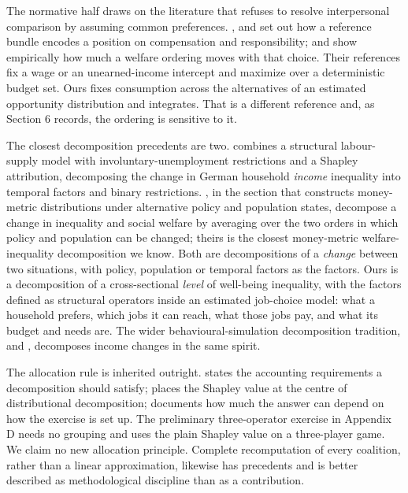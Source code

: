 \documentclass[11pt,a4paper]{article}
\begin{document}
The normative half draws on the literature that refuses to resolve interpersonal comparison by assuming common preferences. \citet{fleurbaeymaniquet2006}, \citet{fleurbaeymaniquet2017} and \citet{fleurbaeymaniquet2018} set out how a reference bundle encodes a position on compensation and responsibility; \citet{decosterhaan2015} and \citet{bargain2013} show empirically how much a welfare ordering moves with that choice. Their references fix a wage or an unearned-income intercept and maximize over a deterministic budget set. Ours fixes consumption across the alternatives of an estimated opportunity distribution and integrates. That is a different reference and, as Section 6 records, the ordering is sensitive to it.

The closest decomposition precedents are two. \citet{muehlhan2023} combines a structural labour-supply model with involuntary-unemployment restrictions and a Shapley attribution, decomposing the change in German household \emph{income} inequality into temporal factors and binary restrictions. \citet{creedyherault2011}, in the section that constructs money-metric distributions under alternative policy and population states, decompose a change in inequality and social welfare by averaging over the two orders in which policy and population can be changed; theirs is the closest money-metric welfare-inequality decomposition we know. Both are decompositions of a \emph{change} between two situations, with policy, population or temporal factors as the factors. Ours is a decomposition of a cross-sectional \emph{level} of well-being inequality, with the factors defined as structural operators inside an estimated job-choice model: what a household prefers, which jobs it can reach, what those jobs pay, and what its budget and needs are. The wider behavioural-simulation decomposition tradition, \citet{bargain2012} and \citet{jessen2019}, decomposes income changes in the same spirit.

The allocation rule is inherited outright. \citet{shorrocks1982} states the accounting requirements a decomposition should satisfy; \citet{shorrocks2013} places the Shapley value at the centre of distributional decomposition; \citet{sastretrannoy2002} documents how much the answer can depend on how the exercise is set up. The preliminary three-operator exercise in Appendix D needs no grouping and uses the plain Shapley value on a three-player game. We claim no new allocation principle. Complete recomputation of every coalition, rather than a linear approximation, likewise has precedents and is better described as methodological discipline than as a contribution.
\end{document}
